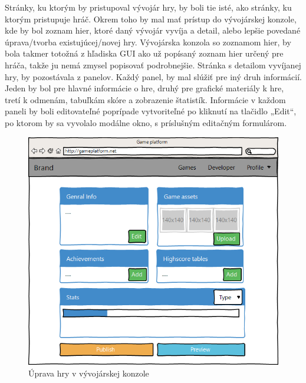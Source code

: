 Stránky, ku ktorým by pristupoval vývojár hry, by boli tie isté, ako stránky, ku ktorým pristupuje hráč. Okrem toho by mal mať prístup do vývojárskej konzole, kde by bol zoznam hier, ktoré daný vývojár vyvíja a detail, alebo lepšie povedané úprava/tvorba existujúcej/novej hry. Vývojárska konzola so zoznamom hier, by bola takmer totožná z hľadiska GUI ako  už popísaný zoznam hier určený pre hráča, takže ju nemá zmysel popisovať podrobnejšie. Stránka s detailom vyvíjanej hry, by pozostávala z panelov. Každý panel, by mal slúžiť pre iný druh informácií. Jeden by bol pre hlavné informácie o hre, druhý pre grafické materiály k hre, tretí k odmenám, tabuľkám skóre a zobrazenie štatistík. Informácie v každom paneli by boli editovateľné poprípade vytvoriteľné po kliknutí na tlačidlo „Edit“, po ktorom by sa vyvolalo modálne okno, s príslušným editačným formulárom.
\begin{figure}[h]
  \centering
  \includegraphics[scale=0.35]{fig/gui-detail-vyvojar.png}
  \caption{Úprava hry v vývojárskej konzole}
  \label{fig:guidetailvyvojar}
\end{figure}


